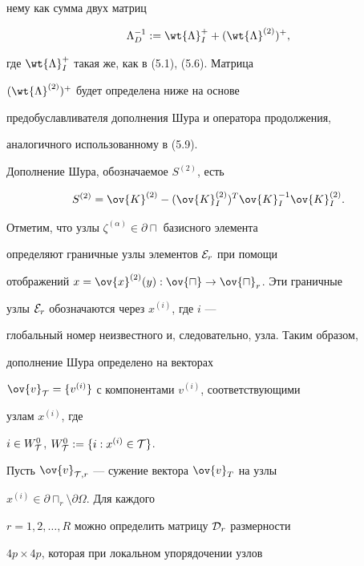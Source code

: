 нему как сумма двух матриц


\begin{equation}\label{eq6.21}


\Lambda^{-1}_D := \wt {\Lambda}^+_I + (\wt{\Lambda}^{(2)})^+,


\end{equation}


где $\wt {\Lambda}^+_I$ такая же, как в (5.1), (5.6). Матрица 


$(\wt{\Lambda}^{(2)})^+$ будет определена ниже на основе 


предобуславливателя дополнения Шура и оператора продолжения, 


аналогичного использованному в (5.9).





Дополнение Шура, обозначаемое $S^{(2)}$, есть 


\begin{equation}\label{eq6.22}


S^{(2)} = \ov{K}^{(2)} - (\ov{K}^{(2)}_I)^T \ov{K}^{-1}_I\ov{K}^{(2)}_I.


\end{equation}


Отметим, что узлы $\zeta^{(\alpha)} \in \partial\sqcap$ базисного элемента 


определяют граничные узлы элементов ${\cal E}_r$ при помощи 


отображений $x=\ov{x}^{(2)}(y):\ov{\sqcap} \to \ov{\sqcap}_r$. Эти граничные 


узлы ${\cal E}_r$ обозначаются через $x^{(i)}$, где $i$ ---


глобальный номер неизвестного и, следовательно, узла. Таким образом,


дополнение Шура определено на векторах 


$\ov{v}_{\cal T} = \{v^{(i)} \}$ с компонентами $v^{(i)}$, соответствующими 


узлам $x^{(i)}$, где 


$i \in W^0_{\cal T}$, $W^0_{\cal T} := \{ i:x^{(i)}\in {\cal T} \}$. 


Пусть $\ov{v}_{{\cal T},r}$ --- сужение вектора $\ov{v}_T$ на узлы 


$x^{(i)} \in \partial\sqcap_r \setminus \partial\Omega$. Для каждого 


$r=1,2,\dotsc,R$ можно определить матрицу ${\cal D}_r$ размерности 


$4p \times 4p$, которая при локальном упорядочении узлов 


